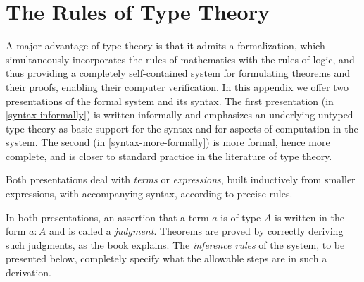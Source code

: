 \chapter{The Rules of Type Theory}
\label{cha:rules}
\bgroup %

\newcommand{\ctx}{\ \textsf{ctx}}
\newcommand{\emptyctx}{\ensuremath{\cdot}}

\newcommand{\production}{\vcentcolon\vcentcolon=}

\newcommand{\mkbox}[1]{\ensuremath{#1}}

\newcommand{\app}{\mathsf{app}}

\newcommand{\gothic}{\mathfrak}
\newcommand{\gP}{{\gothic p}}
\newcommand{\gM}{{\gothic M}}
\newcommand{\gN}{{\gothic N}}
\newcommand{\rats}{\mathbb{Q}}
\newcommand{\ints}{\mathbb{Z}}

\newcommand{\lbr}{\lbrack\!\lbrack}
\newcommand{\rbr}{\rbrack\!\rbrack}
\newcommand{\sem}[2] {\lbr #1 \rbr_{#2}}  %
\newcommand{\APP}[2] {{\sf app}(#1,#2)}  %
\newcommand{\nats}{\mathbb{N}}
\newcommand{\Con}{{\sf Con}}
\newcommand{\Elem}{{\sf Elem}}
\newcommand{\myId}{1}
\newcommand{\mypp}{{\sf p}}
\newcommand{\qq}{{\sf q}}
\newcommand{\mySp}{{\sf Sp}}
\newcommand{\conv}{\sim}
\newcommand{\LIM}{{\sf lim}}
\newcommand{\nn}{{\sf n}}
\newcommand{\Fam}{{\sf Fam}}

A major advantage of type theory is that it admits a formalization, which
simultaneously incorporates the rules of mathematics with the rules of logic,
and thus providing a completely self-contained system for formulating theorems
and their proofs, enabling their computer verification.  In this appendix we
offer two presentations of the formal system and its syntax.  The first
presentation (in \autoref{syntax-informally}) is written informally and
emphasizes an underlying untyped type theory as basic support for the syntax
and for aspects of computation in the system.  The second (in
\autoref{syntax-more-formally}) is more formal, hence more complete, and is
closer to standard practice in the literature of type theory.

Both presentations deal with {\em terms} or {\em expressions}, built
inductively from smaller expressions, with accompanying syntax, according to
precise rules.

In both presentations, an assertion that a term $a$ is of type $A$ is written
in the form $a:A$ and is called a {\em judgment}.  Theorems are proved by
correctly deriving such judgments, as the book explains.  The {\em inference
  rules} of the system, to be presented below, completely specify what the
allowable steps are in such a derivation.

